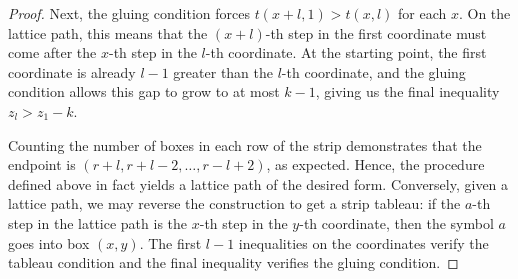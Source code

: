 \documentclass[11pt,reqno]{amsart}
\theoremstyle{definition}
\theoremstyle{problem}
\theoremstyle{plain}
\theoremstyle{remark}
\theoremstyle{theorem}
\numberwithin{equation}{section}
\numberwithin{figure}{section}
\begin{document}
\begin{proof}

  Next, the gluing condition forces $t(x+l,1)>t(x,l)$ for each $x$.
  On the lattice path, this means that the $(x+l)$-th step in the
  first coordinate must come after the $x$-th step in the $l$-th
  coordinate. At the starting point, the first coordinate is already
  $l-1$ greater than the $l$-th coordinate, and the gluing condition
  allows this gap to grow to at most $k-1$, giving us the final
  inequality $z_l>z_1-k$.

  Counting the number of boxes in each row of the strip demonstrates
  that the endpoint is $(r+l,r+l-2,\ldots,r-l+2)$, as expected.
  Hence, the procedure defined above in fact yields a lattice path of
  the desired form.  Conversely, given a lattice path, we may reverse
  the construction to get a strip tableau: if the $a$-th step in the
  lattice path is the $x$-th step in the $y$-th coordinate, then the
  symbol $a$ goes into box $(x,y)$.  The first $l-1$ inequalities on
  the coordinates verify the tableau condition and the final
  inequality verifies the gluing condition.
\end{proof}
\end{document}
